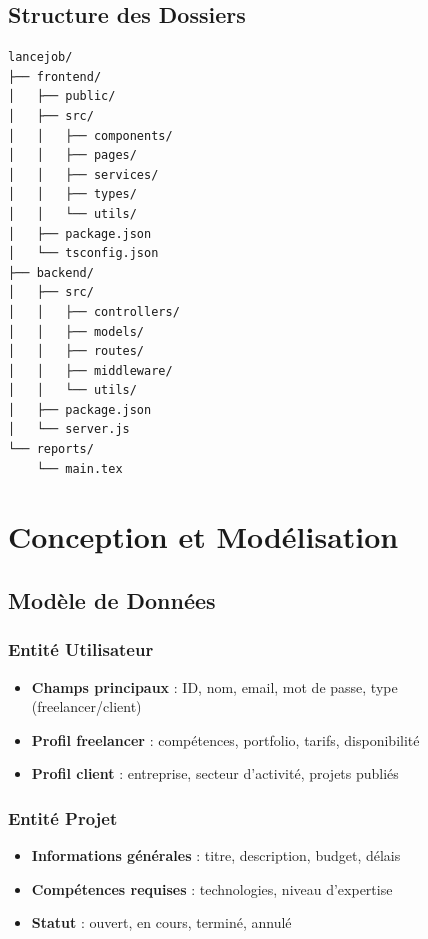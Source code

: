 \documentclass[12pt,a4paper]{article}
\begin{document}
\subsection{Structure des Dossiers}

\begin{lstlisting}[language=bash, caption=Structure du projet]
lancejob/
├── frontend/
│   ├── public/
│   ├── src/
│   │   ├── components/
│   │   ├── pages/
│   │   ├── services/
│   │   ├── types/
│   │   └── utils/
│   ├── package.json
│   └── tsconfig.json
├── backend/
│   ├── src/
│   │   ├── controllers/
│   │   ├── models/
│   │   ├── routes/
│   │   ├── middleware/
│   │   └── utils/
│   ├── package.json
│   └── server.js
└── reports/
    └── main.tex
\end{lstlisting}

\section{Conception et Modélisation}

\subsection{Modèle de Données}

\subsubsection{Entité Utilisateur}
\begin{itemize}
    \item \textbf{Champs principaux} : ID, nom, email, mot de passe, type (freelancer/client)
    \item \textbf{Profil freelancer} : compétences, portfolio, tarifs, disponibilité
    \item \textbf{Profil client} : entreprise, secteur d'activité, projets publiés
\end{itemize}

\subsubsection{Entité Projet}
\begin{itemize}
    \item \textbf{Informations générales} : titre, description, budget, délais
    \item \textbf{Compétences requises} : technologies, niveau d'expertise
    \item \textbf{Statut} : ouvert, en cours, terminé, annulé
\end{itemize}
\end{document}
